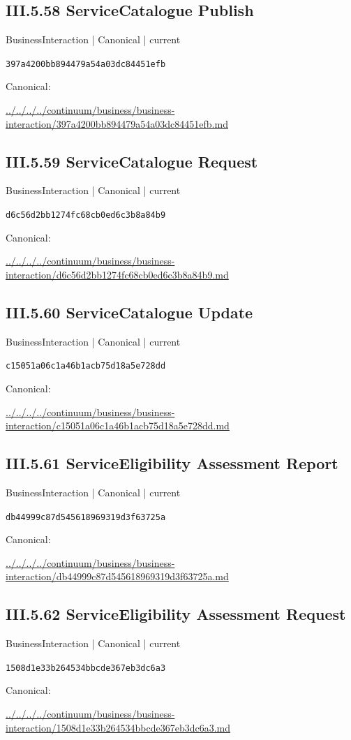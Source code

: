 \documentclass[10pt,a4paper]{article}
\begin{document}
\subsection*{III.5.58 ServiceCatalogue Publish}
{\small BusinessInteraction | Canonical | current}\par
\texttt{397a4200bb894479a54a03dc84451efb}\par
Canonical: \par
{\footnotesize\url{../../../../continuum/business/business-interaction/397a4200bb894479a54a03dc84451efb.md}}\par
\subsection*{III.5.59 ServiceCatalogue Request}
{\small BusinessInteraction | Canonical | current}\par
\texttt{d6c56d2bb1274fc68cb0ed6c3b8a84b9}\par
Canonical: \par
{\footnotesize\url{../../../../continuum/business/business-interaction/d6c56d2bb1274fc68cb0ed6c3b8a84b9.md}}\par
\subsection*{III.5.60 ServiceCatalogue Update}
{\small BusinessInteraction | Canonical | current}\par
\texttt{c15051a06c1a46b1acb75d18a5e728dd}\par
Canonical: \par
{\footnotesize\url{../../../../continuum/business/business-interaction/c15051a06c1a46b1acb75d18a5e728dd.md}}\par
\subsection*{III.5.61 ServiceEligibility Assessment Report}
{\small BusinessInteraction | Canonical | current}\par
\texttt{db44999c87d545618969319d3f63725a}\par
Canonical: \par
{\footnotesize\url{../../../../continuum/business/business-interaction/db44999c87d545618969319d3f63725a.md}}\par
\subsection*{III.5.62 ServiceEligibility Assessment Request}
{\small BusinessInteraction | Canonical | current}\par
\texttt{1508d1e33b264534bbcde367eb3dc6a3}\par
Canonical: \par
{\footnotesize\url{../../../../continuum/business/business-interaction/1508d1e33b264534bbcde367eb3dc6a3.md}}\par
\end{document}
